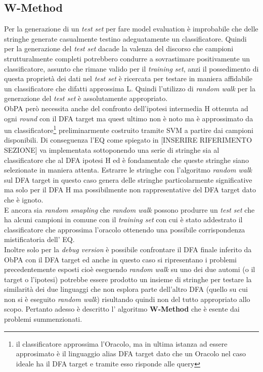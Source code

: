 \subsection{W-Method}
Per la generazione di un \textit{test set} per fare model evaluation  è improbabile che delle stringhe generate casualmente testino adeguatamente un classificatore. Quindi per la generazione del \textit{test set} dacade la valenza del discorso che campioni strutturalmente completi potrebbero condurre a sovrastimare positivamente un classificatore, assunto che rimane valido per il \textit{training set}, anzi il possedimento di questa proprietà dei dati nel \textit{test set} è ricercata per testare in maniera affidabile un classificatore che difatti approssima \ac{L}. Quindi l'utilizzo di \textit{random walk} per la generazione del \textit{test set} è assolutamente appropriato. \\   \ac{ObPA} però necessita anche del confronto dell'ipotesi intermedia \ac{H} ottenuta ad ogni \textit{round} con il \ac{DFA} target ma quest ultimo non è noto ma è approssimato da un classificatore\footnote{il classificatore approssima l'Oracolo, ma in ultima istanza ad essere approsimato è il linguaggio alias \ac{DFA} target dato che un Oracolo nel caso ideale ha il \ac{DFA} target e tramite esso risponde alle query} preliminarmente costruito tramite \ac{SVM} a partire dai campioni disponibili.   Di conseguenza l'\ac{EQ} come spiegato in [INSERIRE RIFERIMENTO SEZIONE] va implementata sottoponendo  una serie di stringhe sia al classificatore che al \ac{DFA} ipotesi \ac{H} ed è fondamentale che queste stringhe siano selezionate in maniera attenta. Estrarre le stringhe con l'algoritmo \textit{random walk} sul \ac{DFA} target in questo caso genera delle stringhe particolarmente significative ma solo per il \ac{DFA} \ac{H} ma possibilmente non rappresentative del \ac{DFA} target dato che è ignoto.\\
 E ancora sia  \textit{random smapling} che \textit{random walk} possono produrre un \textit{test set} che ha alcuni campioni in comune con il \textit{training set} con cui è stato addestrato il classificatore che approssima l'oracolo ottenendo una possibile corrispondenza mistificatoria dell' \ac{EQ}.\\
 Inoltre solo per la \textit{debug version} è possibile confrontare il \ac{DFA} finale inferito da \ac{ObPA} con il \ac{DFA} target ed anche in questo caso si ripresentano i problemi precedentemente esposti cioè eseguendo \textit{random walk} su uno dei due automi (o il target o l'ipotesi) potrebbe essere prodotto un insieme di stringhe per testare la similarità dei due linguaggi che non esplora parte dell'altro \ac{DFA} (quello su cui non si è eseguito \textit{random walk}) risultando quindi non del tutto appropriato allo scopo. Pertanto adesso è descritto l' algoritmo \textbf{W-Method} \cite{Chow78} che è esente dai problemi summenzionati.

